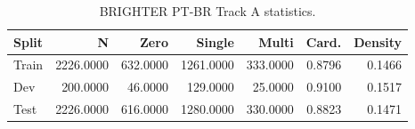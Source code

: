 \begin{table}[t]
\centering
\small
\caption{BRIGHTER PT-BR Track A statistics.}
\label{tab:dataset}
\begin{tabular}{lrrrrrr}
\toprule
Split & N & Zero & Single & Multi & Card. & Density \\
\midrule
Train & 2226.0000 & 632.0000 & 1261.0000 & 333.0000 & 0.8796 & 0.1466 \\
Dev & 200.0000 & 46.0000 & 129.0000 & 25.0000 & 0.9100 & 0.1517 \\
Test & 2226.0000 & 616.0000 & 1280.0000 & 330.0000 & 0.8823 & 0.1471 \\
\bottomrule
\end{tabular}
\end{table}

